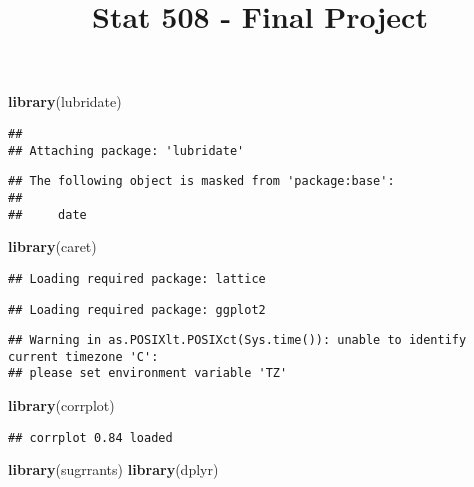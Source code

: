 \documentclass[
]{article}
\title{Stat 508 - Final Project}
\date{}
\newenvironment{Shaded}{\begin{snugshade}}{\end{snugshade}}
\newcommand{\KeywordTok}[1]{\textcolor[rgb]{0.13,0.29,0.53}{\textbf{#1}}}
\newcommand{\NormalTok}[1]{#1}
\begin{document}
\maketitle

\begin{Shaded}
\begin{Highlighting}[]
\KeywordTok{library}\NormalTok{(lubridate)}
\end{Highlighting}
\end{Shaded}

\begin{verbatim}
## 
## Attaching package: 'lubridate'
\end{verbatim}

\begin{verbatim}
## The following object is masked from 'package:base':
## 
##     date
\end{verbatim}

\begin{Shaded}
\begin{Highlighting}[]
\KeywordTok{library}\NormalTok{(caret)}
\end{Highlighting}
\end{Shaded}

\begin{verbatim}
## Loading required package: lattice
\end{verbatim}

\begin{verbatim}
## Loading required package: ggplot2
\end{verbatim}

\begin{verbatim}
## Warning in as.POSIXlt.POSIXct(Sys.time()): unable to identify current timezone 'C':
## please set environment variable 'TZ'
\end{verbatim}

\begin{Shaded}
\begin{Highlighting}[]
\KeywordTok{library}\NormalTok{(corrplot)}
\end{Highlighting}
\end{Shaded}

\begin{verbatim}
## corrplot 0.84 loaded
\end{verbatim}

\begin{Shaded}
\begin{Highlighting}[]
\KeywordTok{library}\NormalTok{(sugrrants)}
\KeywordTok{library}\NormalTok{(dplyr)}
\end{Highlighting}
\end{Shaded}
\end{document}
